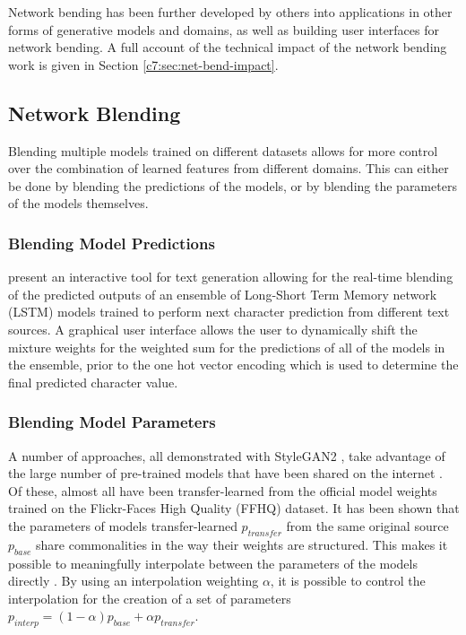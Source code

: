 Network bending has been further developed by others into applications in other forms of generative models and domains, as well as building user interfaces for network bending.
A full account of the technical impact of the network bending work is given in Section \ref{c7:sec:net-bend-impact}.

\subsection{Network Blending}
\label{survey:blending}

Blending multiple models trained on different datasets allows for more control over the combination of learned features from different domains. 
This can either be done by blending the predictions of the models, or by blending the parameters of the models themselves.

\subsubsection{Blending Model Predictions} 

\citet{akten2016real} present an interactive tool for text generation allowing for the real-time blending of the predicted outputs of an ensemble of Long-Short Term Memory network (LSTM) models \citep{hochreiter1997long} trained to perform next character prediction from different text sources. 
A graphical user interface allows the user to dynamically shift the mixture weights for the weighted sum for the predictions of all of the models in the ensemble, prior to the one hot vector encoding which is used to determine the final predicted character value.


\subsubsection{Blending Model Parameters} 
A number of approaches, all demonstrated with StyleGAN2 \citep{karras2019analyzing}, take advantage of the large number of pre-trained models that have been shared on the internet \citep{pinkney2020awesome}. 
Of these, almost all have been transfer-learned from the official model weights trained on the Flickr-Faces High Quality (FFHQ) dataset.
It has been shown that the parameters of models transfer-learned $p_{transfer}$ from the same original source $p_{base}$ share commonalities in the way their weights are structured. 
This makes it possible to meaningfully interpolate between the parameters of the models directly \citep{aydao2020interp}. 
By using an interpolation weighting $\alpha$, it is possible to control the interpolation for the creation of a set of parameters $p_{interp} = (1 - \alpha)p_{base} + \alpha p_{transfer}$. 

